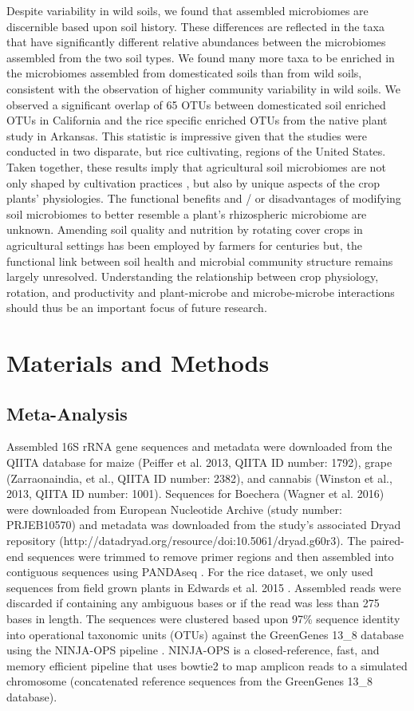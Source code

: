 Despite variability in wild soils, we found that assembled microbiomes are discernible based upon soil history. These differences are reflected in the taxa that have significantly different relative abundances between the microbiomes assembled from the two soil types. We found many more taxa to be enriched in the microbiomes assembled from domesticated soils than from wild soils, consistent with the observation of higher community variability in wild soils. We observed a significant overlap of 65 OTUs between domesticated soil enriched OTUs in California and the rice specific enriched OTUs from the native plant study in Arkansas. This statistic is impressive given that the studies were conducted in two disparate, but rice cultivating, regions of the United States. Taken together, these results imply that agricultural soil microbiomes are not only shaped by cultivation practices \cite{Edwards2015}, but also by unique aspects of the crop plants' physiologies. The functional benefits and / or disadvantages of modifying soil microbiomes to better resemble a plant's rhizospheric microbiome are unknown. Amending soil quality and nutrition by rotating cover crops in agricultural settings has been employed by farmers for centuries but, the functional link between soil health and microbial community structure remains largely unresolved. Understanding the relationship between crop physiology, rotation, and productivity and plant-microbe and microbe-microbe interactions should thus be an important focus of future research.

\section{Materials and Methods}
\subsection{Meta-Analysis}
Assembled 16S rRNA gene sequences and metadata were downloaded from the QIITA database for maize (Peiffer et al. 2013, QIITA ID number: 1792), grape (Zarraonaindia, et al., QIITA ID number: 2382), and cannabis (Winston et al., 2013, QIITA ID number: 1001). Sequences for Boechera (Wagner et al. 2016) were downloaded from European Nucleotide Archive (study number: PRJEB10570) and metadata was downloaded from the study's associated Dryad repository (http://datadryad.org/resource/doi:10.5061/dryad.g60r3). The paired-end sequences were trimmed to remove primer regions and then assembled into contiguous sequences using PANDAseq \cite{Masella2012}. For the rice dataset, we only used sequences from field grown plants in Edwards et al. 2015 \cite{Edwards2015}. Assembled reads were discarded if containing any ambiguous bases or if the read was less than 275 bases in length. The sequences were clustered based upon 97\% sequence identity into operational taxonomic units (OTUs) against the GreenGenes \cite{DeSantis2006} 13\_8 database using the NINJA-OPS pipeline \cite{Al-Ghalith2016}. NINJA-OPS is a closed-reference, fast, and memory efficient pipeline that uses bowtie2 \cite{Langmead2012} to map amplicon reads to a simulated chromosome (concatenated reference sequences from the GreenGenes 13\_8 database).

